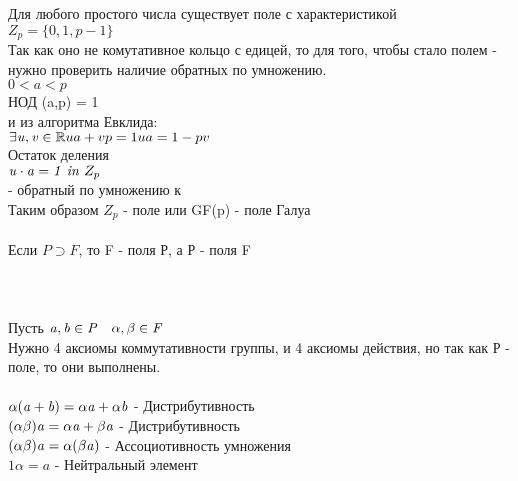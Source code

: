  \\

 \\
Для любого простого числа  существует поле с характеристикой  \\
$Z_{p} = \{0,1, p-1\}$ \\
Так как оно не комутативное кольцо с едицей, то для того, чтобы стало полем - нужно проверить наличие обратных по умножению. \\
$0<a<p$ \\
НОД (a,p) = 1 \\
и из алгоритма Евклида: \\
$
\exists \mathit {u,v} \in \mathbb {R} \\
ua + vp = 1 \\
ua = 1 - pv
$ \\
Остаток деления  \\
$\mathit {u \cdot a = 1 ~in~} Z_{p}$ \\
 - обратный по умножению к  \\
Таким образом $Z_p$ - поле или GF(p) - поле Галуа \\

 \\
Если $P \supset F$, то F -  поля Р, а Р -  поля F \\

 \\

 \\

 \\

Пусть $\mathit{a,b \in P \quad \alpha,\beta\in F}$ \\
Нужно 4 аксиомы коммутативности группы, и 4 аксиомы действия, но так как Р - поле, то они выполнены. \\
 \\
$\mathit{\alpha(a+b)=\alpha a + \alpha b}$ - Дистрибутивность \\
$\mathit{(\alpha \beta)a=\alpha a + \beta a}$ - Дистрибутивность \\
$\mathit{(\alpha \beta)a=\alpha(\beta a)}$ - Ассоциотивность умножения \\
$1\alpha=a$ - Нейтральный элемент \\

